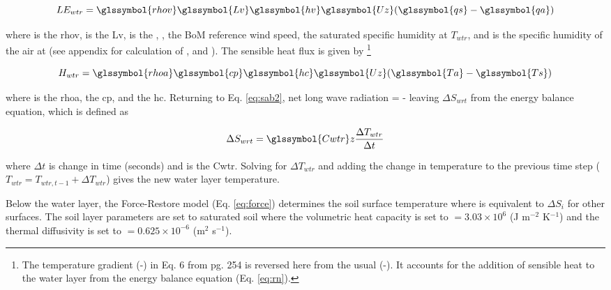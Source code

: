\documentclass[final,3p,times,authoryear]{elsarticle}
\begin{document}
\begin{equation} 
LE_{wtr} = \glssymbol{rhov} \glssymbol{Lv} \glssymbol{hv} \glssymbol{Uz} (\glssymbol{qs} - \glssymbol{qa})
\label{eq:lewtr} \end{equation} 


where  is the \glsdesc{rhov},  is the \glsdesc{Lv},  is the  \citep{Jones2005,Hicks1972}, , the BoM reference wind speed,  the saturated specific humidity at $T_{wtr}$, and  is the specific humidity of the air at  (see appendix for calculation of ,  and ). The sensible heat flux is given by \cite{MolinaMartinez2006}\footnote{The temperature gradient (-) in Eq. 6 from \cite{MolinaMartinez2006} pg. 254 is reversed here from the usual (-). It accounts for the addition of sensible heat to the water layer from the energy balance equation (Eq. \ref{eq:rn}).}

\begin{equation} 
H_{wtr} = \glssymbol{rhoa} \glssymbol{cp} \glssymbol{hc} \glssymbol{Uz} (\glssymbol{Ta}-\glssymbol{Ts})
\label{eq:hwtr} \end{equation} 

where  is the \glsdesc{rhoa},  the \glsdesc{cp}, and  the \glsdesc{hc}. Returning to Eq. \ref{eq:sab2}, net long wave radiation  =  -  leaving $\Delta S_{wrt}$ from the energy balance equation, which is defined as \citep{MolinaMartinez2006}

\begin{equation} 
\Delta S_{wrt} = \glssymbol{Cwtr} z \frac{\Delta T_{wtr}}{\Delta t}
\label{eq:swrt} \end{equation}



where $\Delta t$ is change in time (seconds) and  is the \glsdesc{Cwtr}. Solving for $\Delta T_{wtr}$ and adding the change in temperature to the previous time step ($T_{wtr} = T_{wtr,t-1}  + \Delta T_{wtr}$) gives the new water layer temperature. 


Below the water layer, the Force-Restore model (Eq. \ref{eq:force}) determines the soil surface temperature where  is equivalent to $\Delta S_{i}$  for other surfaces. The soil layer parameters are set to saturated soil where the volumetric heat capacity is set to  $= 3.03 \times 10^{6}$ (J m$^{-2}$ K$^{-1}$) and the thermal diffusivity is set to  $= 0.625 \times 10^{-6}$ (m$^{2}$ s$^{-1}$). 
\end{document}
